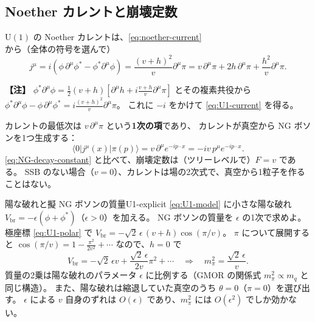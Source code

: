 \documentclass[uplatex,dvipdfmx,a4paper,11pt,openany]{jsbook}
\newenvironment{note}{\vspace{1ex}\par\footnotesize\noindent\textbf{【注】}}{\par\vspace{1ex}}
\numberwithin{equation}{chapter}
\theoremstyle{definition}
\theoremstyle{plain}
\theoremstyle{remark}
\newcommand{\U}{\mathrm{U}}
\begin{document}
\subsection{Noether カレントと崩壊定数}
$\U(1)$ の Noether カレントは、\eqref{eq:noether-current} から（全体の符号を選んで）
\begin{equation}
j^\mu=i\left(\phi\,\partial^\mu\phi^*-\phi^*\partial^\mu\phi\right)
=\frac{(v+h)^2}{v}\partial^\mu\pi
=v\,\partial^\mu\pi+2h\,\partial^\mu\pi+\frac{h^2}{v}\partial^\mu\pi .
\label{eq:U1-current}
\end{equation}
\begin{note}
$\phi^*\partial^\mu\phi=\frac12(v+h)\left[\partial^\mu h+i\frac{v+h}{v}\partial^\mu\pi\right]$ とその複素共役から
$\phi^*\partial^\mu\phi-\phi\,\partial^\mu\phi^*=i\frac{(v+h)^2}{v}\partial^\mu\pi$。
これに $-i$ をかけて \eqref{eq:U1-current} を得る。
\end{note}
カレントの最低次は $v\,\partial^\mu\pi$ という\textbf{1次の項}であり、
カレントが真空から NG ボソンを1つ生成する：
\begin{equation}
\langle0|j^\mu(x)|\pi(p)\rangle=v\,\partial^\mu e^{-ip\cdot x}=-iv\,p^\mu e^{-ip\cdot x}.
\end{equation}
\eqref{eq:NG-decay-constant} と比べて、崩壊定数は（ツリーレベルで）$F=v$ である。
SSB のない場合（$v=0$）、カレントは場の2次式で、真空から1粒子を作ることはない。
\begin{myex}{陽な破れと擬 NG ボソンの質量}{U1-explicit}
\eqref{eq:U1-model} に小さな陽な破れ $V_{\mathrm{br}}=-\epsilon(\phi+\phi^*)$（$\epsilon>0$）を加える。
NG ボソンの質量を $\epsilon$ の1次で求めよ。
\tcblower
極座標 \eqref{eq:U1-polar} で $V_{\mathrm{br}}=-\sqrt2\,\epsilon\,(v+h)\cos(\pi/v)$。
$\pi$ について展開すると $\cos(\pi/v)=1-\frac{\pi^2}{2v^2}+\cdots$ なので、$h=0$ で
\[
V_{\mathrm{br}}=-\sqrt2\,\epsilon v+\frac{\sqrt2\,\epsilon}{2v}\pi^2+\cdots
\quad\Longrightarrow\quad
m_\pi^2=\frac{\sqrt2\,\epsilon}{v}.
\]
質量の2乗は陽な破れのパラメータ $\epsilon$ に比例する（GMOR の関係式 $m_\pi^2\propto m_q$ と同じ構造）。
また、陽な破れは縮退していた真空のうち $\theta=0$（$\pi=0$）を選び出す。
$\epsilon$ による $v$ 自身のずれは $O(\epsilon)$ であり、$m_\pi^2$ には $O(\epsilon^2)$ でしか効かない。
\end{myex}
\end{document}
